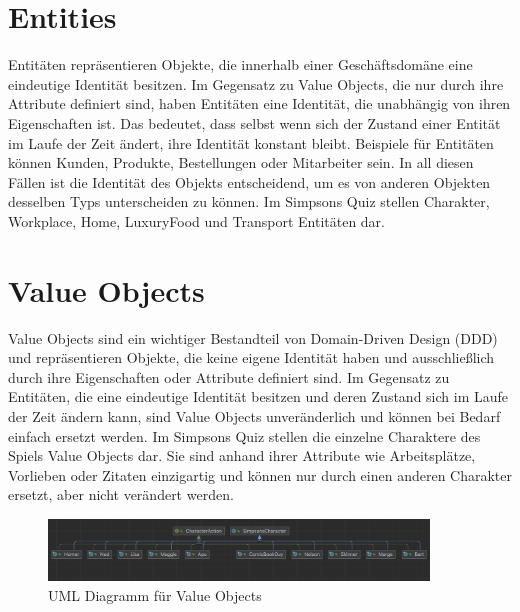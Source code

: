 \section{Entities}
Entitäten repräsentieren Objekte, die innerhalb einer Geschäftsdomäne eine eindeutige Identität besitzen. Im Gegensatz zu Value Objects, die nur durch ihre Attribute definiert sind, haben Entitäten eine Identität, die unabhängig von ihren Eigenschaften ist. Das bedeutet, dass selbst wenn sich der Zustand einer Entität im Laufe der Zeit ändert, ihre Identität konstant bleibt. Beispiele für Entitäten können Kunden, Produkte, Bestellungen oder Mitarbeiter sein. In all diesen Fällen ist die Identität des Objekts entscheidend, um es von anderen Objekten desselben Typs unterscheiden zu können. Im Simpsons Quiz stellen Charakter, Workplace, Home, LuxuryFood und Transport Entitäten dar.
\newpage

\section{Value Objects}
Value Objects sind ein wichtiger Bestandteil von Domain-Driven Design (DDD) und repräsentieren Objekte, die keine eigene Identität haben und ausschließlich durch ihre Eigenschaften oder Attribute definiert sind. Im Gegensatz zu Entitäten, die eine eindeutige Identität besitzen und deren Zustand sich im Laufe der Zeit ändern kann, sind Value
Objects unveränderlich und können bei Bedarf einfach ersetzt werden. Im Simpsons Quiz stellen die einzelne Charaktere des Spiels Value Objects dar. Sie sind anhand ihrer Attribute wie Arbeitsplätze, Vorlieben oder Zitaten einzigartig und können nur durch einen anderen Charakter ersetzt, aber nicht verändert werden.
\begin{figure}[ht]
    \centering
    \includegraphics[width=0.9\textwidth]{Bilder/charakter.png}
    \caption{UML Diagramm für Value Objects}
    \label{fig:ValueObject}
\end{figure}


